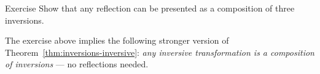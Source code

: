 \begin{thm}{Exercise}\label{ex:reflection/inversive}
Show that any reflection can be presented as a composition of three inversions. 
\end{thm}

The exercise above implies the following stronger version of Theorem~\ref{thm:inversions-inversive}:
\textit{any inversive transformation is a composition of inversions} ---
no reflections needed.
